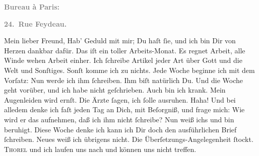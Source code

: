 \pstart
           \begin{otherlanguage}{french}\textcolor{gray}{\textbf{\textbf{Bureau à Paris:}}}\end{otherlanguage}\pend
           
\pstart
           \begin{otherlanguage}{french}\textcolor{gray}{\textbf{\textbf{24. Rue Feydeau.}}}\end{otherlanguage}\pend
           
\pstart\center{}Mein lieber Freund,\pend\vspace{0.5em}
\pstart
           Hab’ Geduld mit mir; Du haſt ſie, und ich bin Dir von Herzen dankbar dafür. Das iſt
               ein toller Arbeits-Monat. Es regnet Arbeit, alle Winde
               wehen Arbeit einher. Ich ſchreibe Artikel jeder Art über Gott und die Welt und
               Sonſtiges. Sonſt komme ich zu nichts. Jede Woche beginne ich mit dem Vorſatz: Nun
               werde ich ihm ſchreiben. Ihm biſt natürlich Du. Und die Woche geht vorüber, und ich
               habe nicht geſchrieben. {\pb}Auch bin ich krank. Mein
               Augenleiden wird ernſt. Die Ärzte ſagen, ich ſolle ausruhen. Haha! Und bei alledem
               denke ich faſt jeden Tag an Dich, mit Beſorgniß, und frage mich: Wie wird er das
               aufnehmen, daß ich ihm nicht ſchreibe? Nun weiß ichs und bin beruhigt. Diese Woche
               denke ich kann ich Dir doch den ausführlichen Brief ſchreiben. Neues weiß ich
               übrigens nicht. Die Überſetzungs-Angelegenheit ſtockt. \textsc{Thorel} und ich laufen uns nach und können {\pb}uns nicht
               treffen.\pend
           
